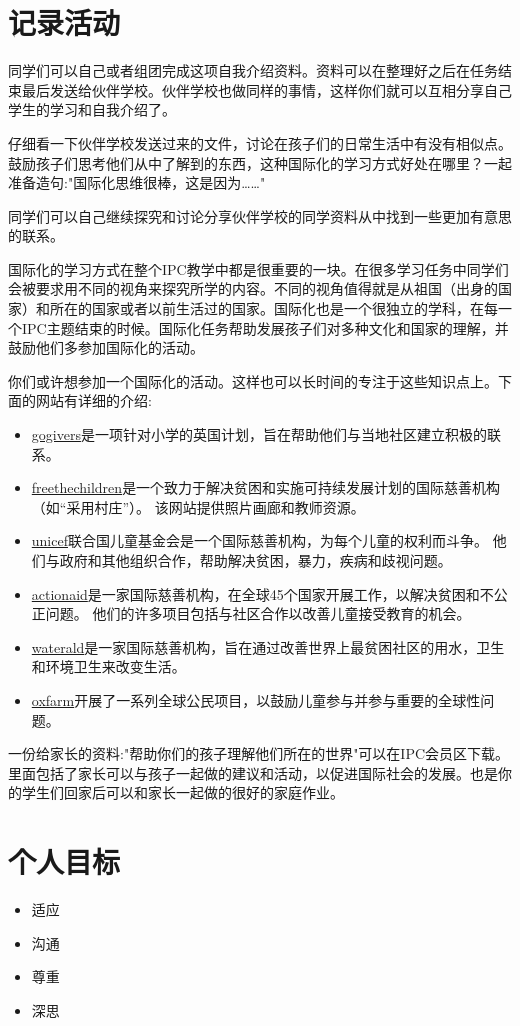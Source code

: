 \section{记录活动}
    同学们可以自己或者组团完成这项自我介绍资料。资料可以在整理好之后在任务结束最后发送给伙伴学校。伙伴学校也做同样的事情，这样你们就可以互相分享自己学生的学习和自我介绍了。\par
    仔细看一下伙伴学校发送过来的文件，讨论在孩子们的日常生活中有没有相似点。鼓励孩子们思考他们从中了解到的东西，这种国际化的学习方式好处在哪里？一起准备造句:"国际化思维很棒，这是因为……"\par
    同学们可以自己继续探究和讨论分享伙伴学校的同学资料从中找到一些更加有意思的联系。\par
    国际化的学习方式在整个IPC教学中都是很重要的一块。在很多学习任务中同学们会被要求用不同的视角来探究所学的内容。不同的视角值得就是从祖国（出身的国家）和所在的国家或者以前生活过的国家。国际化也是一个很独立的学科，在每一个IPC主题结束的时候。国际化任务帮助发展孩子们对多种文化和国家的理解，并鼓励他们多参加国际化的活动。\par
    你们或许想参加一个国际化的活动。这样也可以长时间的专注于这些知识点上。下面的网站有详细的介绍:\par
    \begin{itemize}
      \item \href{http://www.gogivers.org/}{gogivers}是一项针对小学的英国计划，旨在帮助他们与当地社区建立积极的联系。
      \item \href{http://www.freethechildren.com/}{freethechildren}是一个致力于解决贫困和实施可持续发展计划的国际慈善机构（如“采用村庄”）。 该网站提供照片画廊和教师资源。
      \item \href{http://www.unicef.org/}{unicef}联合国儿童基金会是一个国际慈善机构，为每个儿童的权利而斗争。 他们与政府和其他组织合作，帮助解决贫困，暴力，疾病和歧视问题。
      \item \href{http://www.actionaid.org/what-we-do/education}{actionaid}是一家国际慈善机构，在全球45个国家开展工作，以解决贫困和不公正问题。 他们的许多项目包括与社区合作以改善儿童接受教育的机会。
      \item \href{http://www.wateraid.org/}{waterald}是一家国际慈善机构，旨在通过改善世界上最贫困社区的用水，卫生和环境卫生来改变生活。
      \item \href{http://www.oxfam.org.uk/education/global-citizenship}{oxfarm}开展了一系列全球公民项目，以鼓励儿童参与并参与重要的全球性问题。
    \end{itemize}  
    
    \begin{note}
      一份给家长的资料:"帮助你们的孩子理解他们所在的世界"可以在IPC会员区下载。里面包括了家长可以与孩子一起做的建议和活动，以促进国际社会的发展。也是你的学生们回家后可以和家长一起做的很好的家庭作业。
    \end{note}  

\section{个人目标}
    \begin{itemize}
      \item 适应
      \item 沟通 
      \item 尊重
      \item 深思  
     \end{itemize} 
